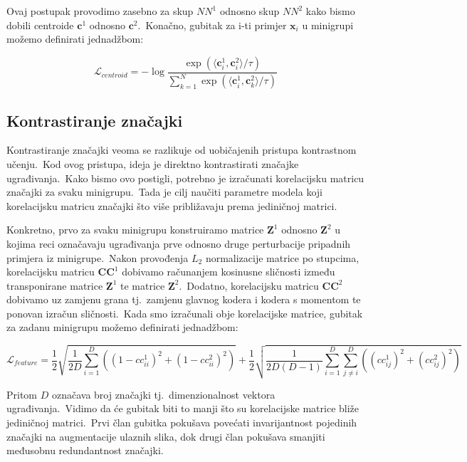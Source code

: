\documentclass[diplomskirad]{fer}
\begin{document}
\pagebreak

Ovaj postupak provodimo zasebno za skup $NN^1$ odnosno skup $NN^2$ kako bismo dobili centroide $\bm{c}^1$ odnosno $\bm{c}^2$.\ Konačno, gubitak za i-ti primjer $\bm{x}_i$ u minigrupi možemo definirati jednadžbom:

\begin{equation}
  \mathcal{L}_{centroid} = - \log{\frac{\exp(\langle \bm{c}_{i}^{1}, \bm{c}_{i}^{2} \rangle / \tau)}{\sum_{k=1}^{N}{\exp(\langle \bm{c}_{i}^{1}, \bm{c}_{k}^{2} \rangle / \tau)}}}
  \label{eq:centroid_loss}
\end{equation}

\subsection{Kontrastiranje značajki}
\label{sub:features}
  
Kontrastiranje značajki veoma se razlikuje od uobičajenih pristupa kontrastnom učenju.\ Kod ovog pristupa, ideja je direktno kontrastirati značajke ugrađivanja.\ 
Kako bismo ovo postigli, potrebno je izračunati korelacijsku matricu značajki za svaku minigrupu.\ Tada je cilj naučiti parametre modela koji korelacijsku matricu značajki što više približavaju prema jediničnoj matrici.\ 

Konkretno, prvo za svaku minigrupu konstruiramo matrice $\bm{Z}^1$ odnosno $\bm{Z}^2$ u kojima reci označavaju ugrađivanja prve odnosno druge perturbacije pripadnih primjera iz minigrupe.\ 
Nakon provođenja $L_2$ normalizacije matrice po stupcima, korelacijsku matricu $\bm{CC}^1$ dobivamo računanjem kosinusne sličnosti između transponirane matrice $\bm{Z}^1$ te matrice $\bm{Z}^2$.\ 
Dodatno, korelacijsku matricu $\bm{CC}^2$ dobivamo uz zamjenu grana tj.\ zamjenu glavnog kodera i kodera s momentom te ponovan izračun sličnosti.\ 
Kada smo izračunali obje korelacijske matrice, gubitak za zadanu minigrupu možemo definirati jednadžbom:

\begin{equation}
  \mathcal{L}_{feature} = \frac{1}{2} \sqrt{\frac{1}{2D}\sum_{i=1}^{D}((1 - cc_{ii}^1)^2 + (1 - cc_{ii}^2)^2)} + \frac{1}{2} \sqrt{\frac{1}{2D(D - 1)}\sum_{i=1}^{D}\sum_{j \neq i}^{D}((cc_{ij}^1)^2 + (cc_{ij}^2)^2)}
  \label{eq:feature_loss}
\end{equation}

Pritom $D$ označava broj značajki tj.\ dimenzionalnost vektora ugrađivanja.\ Vidimo da će gubitak biti to manji što su korelacijske matrice bliže jediničnoj matrici.\ 
Prvi član gubitka pokušava povećati invarijantnost pojedinih značajki na augmentacije ulaznih slika, dok drugi član pokušava smanjiti međusobnu redundantnost značajki.\ 
\end{document}
